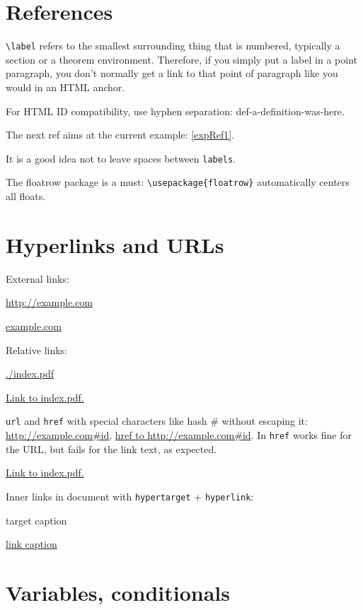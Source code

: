 \documentclass[12pt]{article}
\begin{document}
\section{References}\label{references}

  \lstinline|\label| refers to the smallest surrounding thing that is numbered, typically a section or a theorem environment. Therefore, if you simply put a label in a point paragraph, you don't normally get a link to that point of paragraph like you would in an HTML anchor.

  For HTML ID compatibility, use hyphen separation: def-a-definition-was-here.

  \begin{example}\label{expRef1}
    The next ref aims at the current example: \ref{expRef1}.
  \end{example}

  It is a good idea not to leave spaces between \lstinline|labels|.

  The floatrow package is a must: \lstinline|\usepackage{floatrow}| automatically centers all floats.

\section{Hyperlinks and URLs}\label{hyperlinks-urls}

  External links:

  \url{http://example.com}

  \href{http://example.com}{example.com}

  Relative links:

  \url{./index.pdf}

  \href{./index.pdf}{Link to index.pdf.}

  \lstinline|url| and \lstinline|href| with special characters like hash \# without escaping it: \url{http://example.com#id}, \href{http://example.com#id}{href to http://example.com\#id}. In \lstinline|href| works fine for the URL, but fails for the link text, as expected.

  \href{./index.pdf}{Link to index.pdf.}

  Inner links in document with \lstinline|hypertarget| + \lstinline|hyperlink|:

  \hypertarget{label}{target caption}

  \hyperlink{label}{link caption}

\section{Variables, conditionals}\label{variables}
\end{document}
